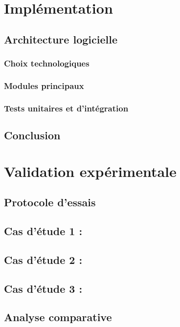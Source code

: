 \documentclass[a4paper,12pt]{article}
\begin{document}
\section{Implémentation}
\label{sec:org1aa2a3c}
\subsection{Architecture logicielle}
\label{sec:org0d84068}
\subsubsection{Choix technologiques}
\label{sec:org4a3ff0f}
\subsubsection{Modules principaux}
\label{sec:org483c49e}
\subsubsection{Tests unitaires et d'intégration}
\label{sec:org14392a7}
\subsection{Conclusion}
\label{sec:orgae99713}
\clearpage
\section{Validation expérimentale}
\label{sec:org7cde99f}
\subsection{Protocole d'essais}
\label{sec:orgfb9767f}

\subsection{Cas d'étude 1 :}
\label{sec:orgee4193e}
\subsection{Cas d'étude 2 :}
\label{sec:org1f79b0b}
\subsection{Cas d'étude 3 :}
\label{sec:org699bc53}

\subsection{Analyse comparative}
\label{sec:orgea17df8}
\end{document}
